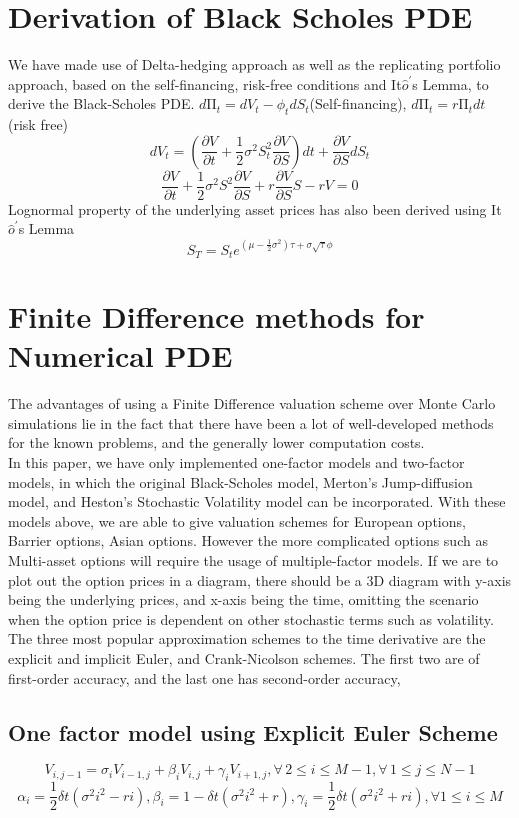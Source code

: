 \section*{Derivation of Black Scholes PDE}
We have made use of Delta-hedging approach as well as the replicating portfolio approach, based on the self-financing, risk-free conditions and It$\hat{o}^{\prime}$s Lemma, to derive the Black-Scholes PDE.
$d\mathrm{\Pi}_{t} = dV_{t} - \phi_{t}dS_{t}$(Self-financing), \quad $d\mathrm{\Pi}_{t} = r\mathrm{\Pi}_{t}dt$(risk free)
$$dV_{t} = (\frac{\partial V}{\partial t}+\frac{1}{2}\sigma^{2}S_{t}^{2}\frac{\partial V}{\partial S})dt + \frac{\partial V}{\partial S}dS_{t}$$
$$\frac{\partial V}{\partial t}+\frac{1}{2}\sigma^{2}S^{2}\frac{\partial V}{\partial S} + r\frac{\partial V}{\partial S}S - rV = 0$$
Lognormal property of the underlying asset prices has also been derived using It$\hat{o}^{\prime}$s Lemma
$$S_{T} = S_{t}e^{(\mu - \frac{1}{2}\sigma^{2})\tau + \sigma\sqrt{\tau}\phi}$$

\section*{Finite Difference methods for Numerical PDE}
The advantages of using a Finite Difference valuation scheme over Monte Carlo simulations lie in the fact that there have been a lot of well-developed methods for the known problems, and the generally lower computation costs.\\[3mm]
In this paper, we have only implemented one-factor models and two-factor models, in which the original Black-Scholes model, Merton's Jump-diffusion model, and Heston's Stochastic Volatility model can be incorporated. With these models above, we are able to give valuation schemes for European options, Barrier options, Asian options. However the more complicated options such as Multi-asset options will require the usage of multiple-factor models.
If we are to plot out the option prices in a diagram, there should be a 3D diagram with y-axis being the underlying prices, and x-axis being the time, omitting the scenario when the option price is dependent on other stochastic terms such as volatility.
The three most popular approximation schemes to the time derivative are the explicit and implicit Euler, and Crank-Nicolson schemes. The first two are of first-order accuracy, and the last one has second-order accuracy\cite{FiniteDifference},

\subsection*{One factor model using Explicit Euler Scheme}
$$V_{i, j-1} = \sigma_{i}V_{i-1,j} + \beta_{i}V_{i,j} + \gamma_{i}V_{i+1,j},  \forall \,2 \le i \le M-1, \forall \,1 \le j \le N-1$$
$$\alpha_{i} = \frac{1}{2}\delta t(\sigma^{2}i^{2} - ri), \beta_{i} = 1-\delta t(\sigma^{2}i^{2} + r), \gamma_{i} = \frac{1}{2}\delta t(\sigma^{2}i^{2} + ri), \forall 1 \le i \le M$$
\newpage
